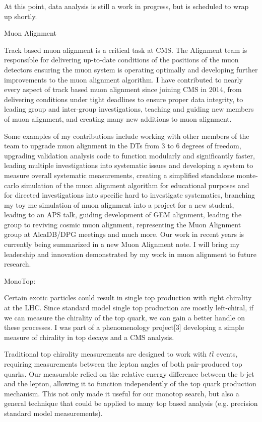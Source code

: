 \documentclass[11pt]{article}
\begin{document}
At this point, data analysis is still a work in progress, but is scheduled to wrap up shortly. 

Muon Alignment

 Track based muon alignment is a critical task at CMS. The Alignment team is responsible for delivering up-to-date conditions of the positions of the muon detectors ensuring the muon system is operating optimally and developing further improvements to the muon alignment algorithm. I have contributed to nearly every aspect of track based muon alignment since joining CMS in 2014, from delivering conditions under tight deadlines to ensure proper data integrity, to leading group and inter-group investigations, teaching and guiding new members of muon alignment, and creating many new additions to muon alignment. 
 
 Some examples of my contributions include working with other members of the team to upgrade muon alignment in the DTs from 3 to 6 degrees of freedom, upgrading validation analysis code to function modularly and significantly faster, leading multiple investigations into systematic issues and developing a system to measure overall systematic measurements, creating a simplified standalone monte-carlo simulation of the muon alignment algorithm for educational purposes and for directed investigations into specific hard to investigate systematics, branching my toy mc simulation of muon alignment into a project for a new student, leading to an APS talk, guiding development of GEM alignment,  leading the group to reviving cosmic muon alignment, representing the Muon Alignment group at AlcaDB/DPG meetings and much more. Our work in recent years is currently being summarized in a new Muon Alignment note. I will bring my leadership and innovation demonstrated by my work in muon alignment to future research. 
 
 
 MonoTop:
 
 Certain exotic particles could result in single top production with right chirality at the LHC. Since standard model single top production are mostly left-chiral, if we can measure the chirality of the top quark, we can gain a better handle on these processes. I was part of a phenomenology project[3] developing a simple measure of chirality in top decays and a CMS analysis. 
 
 Traditional top chirality measurements are designed to work with $t\bar{t}$ events, requiring measurements between the lepton angles of both pair-produced top quarks. Our measurable relied on the relative energy difference between the b-jet and the lepton, allowing it to function independently of the top quark production mechanism. This not only made it useful for our monotop search, but also a general technique that could be applied to many top based analysis (e.g. precision standard model measurements).
 
\end{document}
